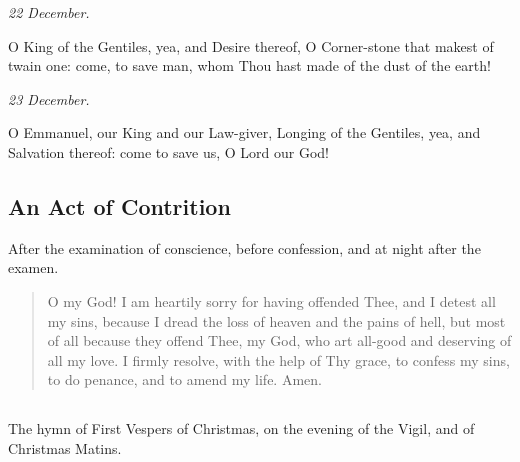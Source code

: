 \noindent\textit{22 December.} \par
\noindent O King of the Gentiles, yea, and Desire thereof, O Corner-stone that makest of twain one: come, to save man, whom Thou hast made of the dust of the earth!\par
\smallskip

\noindent\textit{23 December.} \par
\noindent O Emmanuel, our King and our Law-giver, Longing of the Gentiles, yea, and Salvation thereof: come to save us, O Lord our God!\par
\smallskip

\subsection{An Act of Contrition}

After the examination of conscience, before confession, and at night after the
examen.

\begin{quote}
O my God! I am heartily sorry for having offended Thee, and I detest all my sins, because I dread the loss of heaven and the pains of hell, but most of all because they offend Thee, my God, who art all-good and deserving of all my love. I firmly resolve, with the help of Thy grace, to confess my sins, to do penance, and to amend my life. Amen.\par
\end{quote}

\subsection{}

The hymn of First Vespers of Christmas, on the evening of the Vigil, and of
Christmas Matins.

